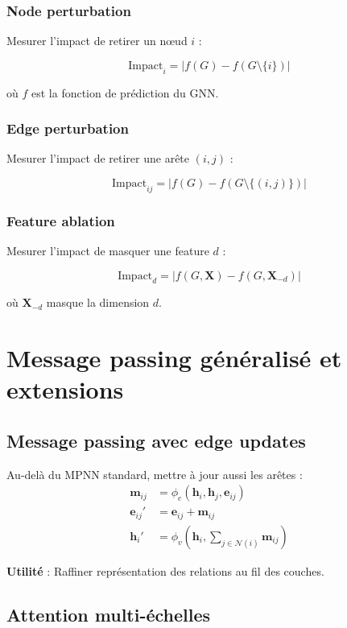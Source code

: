 \subsubsection{Node perturbation}

Mesurer l'impact de retirer un nœud $i$ :

\[
\text{Impact}_i = |f(G) - f(G \setminus \{i\})|
\]

où $f$ est la fonction de prédiction du GNN.

\subsubsection{Edge perturbation}

Mesurer l'impact de retirer une arête $(i,j)$ :

\[
\text{Impact}_{ij} = |f(G) - f(G \setminus \{(i,j)\})|
\]

\subsubsection{Feature ablation}

Mesurer l'impact de masquer une feature $d$ :

\[
\text{Impact}_d = |f(G, \mathbf{X}) - f(G, \mathbf{X}_{-d})|
\]

où $\mathbf{X}_{-d}$ masque la dimension $d$.

\section{Message passing généralisé et extensions}

\subsection{Message passing avec edge updates}

Au-delà du MPNN standard, mettre à jour aussi les arêtes :
\begin{align*}
\mathbf{m}_{ij} &= \phi_e\left(\mathbf{h}_i, \mathbf{h}_j, \mathbf{e}_{ij}\right) \\
\mathbf{e}_{ij}' &= \mathbf{e}_{ij} + \mathbf{m}_{ij} \\
\mathbf{h}_i' &= \phi_v\left(\mathbf{h}_i, \sum_{j \in \mathcal{N}(i)} \mathbf{m}_{ij}\right)
\end{align*}

\textbf{Utilité} : Raffiner représentation des relations au fil des couches.

\subsection{Attention multi-échelles}

